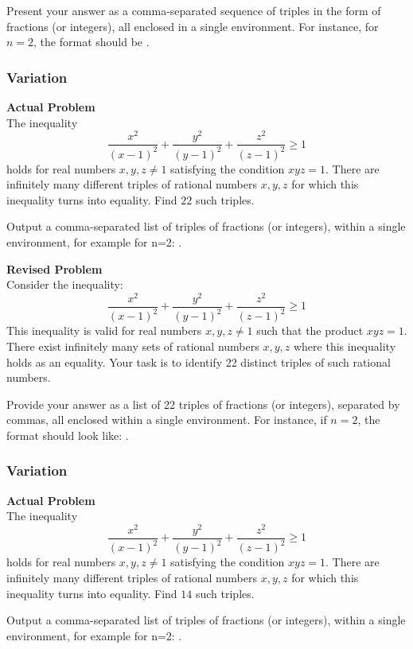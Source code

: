 Present your answer as a comma-separated sequence of triples in the form of fractions (or integers), all enclosed in a single \boxed environment. For instance, for \(n=2\), the format should be .

\subsubsection{Variation}
\textbf{Actual Problem}\\
The inequality
$$
\frac{x^2}{(x-1)^2} + \frac{y^2}{(y-1)^2} + \frac{z^2}{(z-1)^2} \geq 1
$$
holds for real numbers $x, y, z \neq 1$ satisfying the condition $xyz = 1$.
There are infinitely many different triples of rational numbers $x, y, z$ for which this inequality turns into equality.
Find $22$ such triples.


Output a comma-separated list of triples of fractions (or integers), within a single \boxed environment, for example for n=2: .

\textbf{Revised Problem}\\
Consider the inequality:
$$
\frac{x^2}{(x-1)^2} + \frac{y^2}{(y-1)^2} + \frac{z^2}{(z-1)^2} \geq 1
$$
This inequality is valid for real numbers \( x, y, z \neq 1 \) such that the product \( xyz = 1 \). There exist infinitely many sets of rational numbers \( x, y, z \) where this inequality holds as an equality. Your task is to identify 22 distinct triples of such rational numbers.

Provide your answer as a list of 22 triples of fractions (or integers), separated by commas, all enclosed within a single \boxed environment. For instance, if \( n = 2 \), the format should look like: .

\subsubsection{Variation}
\textbf{Actual Problem}\\
The inequality
$$
\frac{x^2}{(x-1)^2} + \frac{y^2}{(y-1)^2} + \frac{z^2}{(z-1)^2} \geq 1
$$
holds for real numbers $x, y, z \neq 1$ satisfying the condition $xyz = 1$.
There are infinitely many different triples of rational numbers $x, y, z$ for which this inequality turns into equality.
Find $14$ such triples.


Output a comma-separated list of triples of fractions (or integers), within a single \boxed environment, for example for n=2: .

